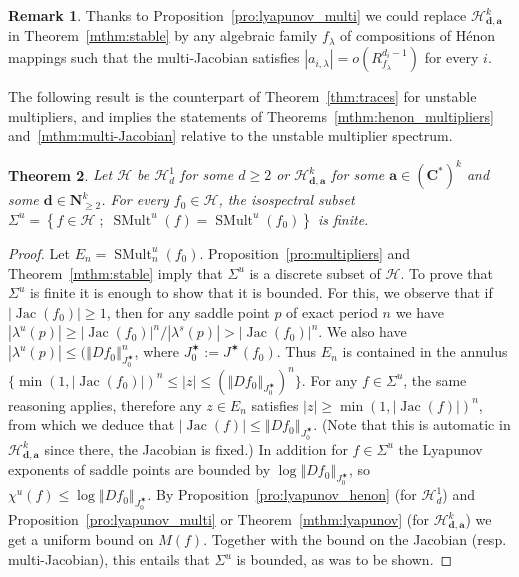 \documentclass[oneside, 12pt]{amsart}
\newcommand{\set}[1]{\left\{#1\right\}}
\newcommand{\norm}[1]{{\left\Vert#1\right\Vert}}
\newcommand{\abs}[1]{\left\vert#1\right\vert}
\newcommand{\jstar}{J^\varstar}
\DeclareMathOperator{\jac}{Jac}
\DeclareMathOperator{\SMult}{SMult}
\newcommand{\C}{\mathbf{C}}
\newcommand{\N}{\mathbf{N}}
\theoremstyle{plain}
\newtheorem{thm}{Theorem}[section]
\theoremstyle{definition}
\newtheorem{rem}[thm]{Remark}
\numberwithin{equation}{section}       %
\numberwithin{equation}{section}       %
\begin{document}
\begin{rem}
Thanks to Proposition~\ref{pro:lyapunov_multi} we could replace 
$\mathcal H^k_{\mathbf{d}, \mathbf{a}}$ in  Theorem~\ref{mthm:stable} by any algebraic family $f_\lambda$ of compositions of Hénon mappings such that the multi-Jacobian satisfies $\abs{a_{i,\lambda}}   = o(R_{f_\lambda}^{d_i-1})$ for every $i$.  
\end{rem}

The following result is the counterpart of Theorem~\ref{thm:traces} for unstable multipliers, and 
implies the   statements of  Theorems~\ref{mthm:henon_multipliers} and~\ref{mthm:multi-Jacobian} relative to the unstable multiplier  spectrum. 
 
\begin{thm}
\label{thm:u_multipliers}
Let $\mathcal H$ be $\mathcal H^1_d$ for some $d\geq 2$ or 
$\mathcal H^k_{\mathbf d,\mathbf a}$ for some $\mathbf a\in (\C^*)^k$ and some $\mathbf d\in \N^k_{\geq 2}$. 
For every $f_0 \in \mathcal H$, the isospectral subset 
 $\Sigma^u  = \set{f \in \mathcal H\; ; \; \SMult^u(f) = \SMult^u(f_0)}$ is  finite.  
\end{thm}

\begin{proof}
Let $E_n =  \SMult^u_n(f_0)$. %
Proposition~\ref{pro:multipliers} and 
Theorem~\ref{mthm:stable} imply that $\Sigma^u$ is a discrete subset of $\mathcal H$. To prove that 
$\Sigma^u$ is finite it is enough  to show that it is bounded. For this, we observe that if 
$\abs{\jac(f_0)}\geq1$, then for any saddle point $p$ of exact period $n$ we have 
$\abs{\lambda^u(p)}\geq  \abs{\jac(f_0)}^n / \abs{\lambda^s(p)} > \abs{\jac(f_0)}^n$. 
We also have $\abs{\lambda^u(p)}\leq (\norm{Df_0}_{\jstar_0}^n$, where $\jstar_0:=\jstar(f_0)$.
 Thus $E_n$ is contained in the annulus $\{\min(1,\abs{\jac(f_0)})^n \leq \abs{z} \leq (\norm{Df_0}_{\jstar_0})^n\}$. 
 For any $f\in \Sigma^u$, the same reasoning applies, therefore 
any $z\in E_n$ satisfies $\abs{z}\geq \min(1, \abs{\jac(f)})^n$, from which we deduce that 
$\abs{\jac(f)}\leq \norm{Df_0}_{\jstar_0}$. (Note that this is automatic in $\mathcal H^k_{\mathbf d,\mathbf a}$ since there, the Jacobian is fixed.) 
In addition  for 
$f\in \Sigma^u$ the Lyapunov exponents of saddle points are bounded by
 $\log \norm{Df_0}_{\jstar_0}$, so $\chi^u(f)\leq \log \norm{Df_0}_{\jstar_0}$.
 By  Proposition~\ref{pro:lyapunov_henon} (for $\mathcal H^1_d$) and 
 Proposition~\ref{pro:lyapunov_multi} or 
 Theorem~\ref{mthm:lyapunov}   (for $\mathcal H^k_{\mathbf d,\mathbf a}$) 
we get a uniform bound on $M(f)$.
Together with the bound on the Jacobian (resp. multi-Jacobian), this entails that 
$\Sigma^u$ is bounded, as was to be shown. 
\end{proof}
\end{document}
